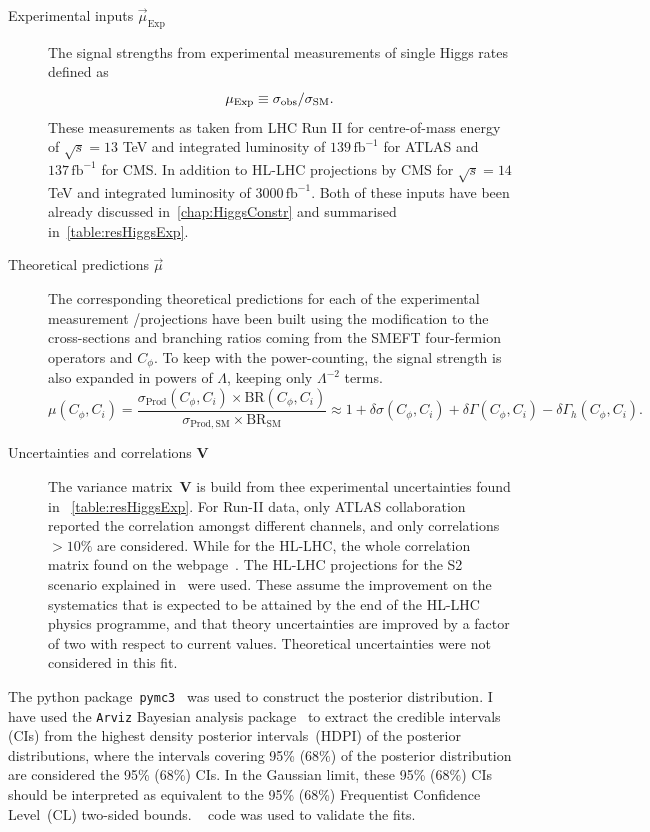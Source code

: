 	\begin{description}
		\item[Experimental inputs $\vec{\mu}_{\mathrm{Exp}}$ ] The signal strengths from experimental measurements of single Higgs rates defined as
		\begin{equation}
			\mu_{\mathrm{Exp}}\equiv \sigma_{\mathrm{obs}}/\sigma_{\mathrm{SM}}.
		\end{equation}
		These measurements as taken from LHC Run II for centre-of-mass energy of $\sqrt{s} = 13$ TeV and  integrated luminosity of $ 139\, \mathrm{fb}^{-1}$ for ATLAS and  $ 137\,\mathrm{fb}^{-1}$ for CMS. In addition to HL-LHC projections by CMS for $\sqrt{s} = 14$ TeV and  integrated luminosity of $ 3000\, \mathrm{fb}^{-1}$. Both of these inputs have been already discussed in~\autoref{chap:HiggsConstr} and summarised in~\autoref{table:resHiggsExp}.
		\item [Theoretical predictions $\vec{\mu}$ ]  The corresponding theoretical predictions for each of the experimental measurement /projections have been built using the modification to the cross-sections and branching ratios coming from the SMEFT four-fermion operators and $C_\phi$. To keep with the power-counting, the signal strength is also expanded in powers of $\Lambda$, keeping only $ \Lambda^{-2}$ terms. 
		\begin{equation}
			\mu(C_\phi,C_i)=\frac{\sigma_\mathrm{ Prod}(C_\phi,C_i) \times \mathrm{ BR}(C_\phi,C_i)}{\sigma_\mathrm{ Prod, SM}\times \mathrm{BR}_\mathrm{ SM}} \approx 1+\delta \sigma(C_\phi,C_i)+\delta\Gamma(C_\phi,C_i)-\delta \Gamma_h(C_\phi,C_i).
			\label{linear-mu}
		\end{equation}
		\item [Uncertainties and correlations $\mathbf{V}$ ]  The variance matrix~$\mathbf{V}$ is build from thee experimental uncertainties found in ~\autoref{table:resHiggsExp}. For Run-II data, only ATLAS collaboration reported the correlation amongst different channels, and only correlations $> 10\%$ are considered. While for the HL-LHC, the whole correlation matrix found on the webpage~\cite{twiki}.  The HL-LHC projections for the S2 scenario explained in~\cite{Cepeda:2019klc} were used. These assume the improvement on the systematics that is expected to be attained by the end of the HL-LHC physics programme, and that theory uncertainties are improved by a factor of two with respect to current values. Theoretical uncertainties were not considered in this fit.
	\end{description}
	The python package~\texttt{pymc3}~\cite{Salvatier2016} was used to construct the posterior distribution. I have used the \texttt{Arviz} Bayesian analysis package~\cite{arviz_2019} to extract the credible intervals (CIs) from the highest density posterior intervals~(HDPI) of the posterior distributions, where the intervals covering 95\% (68\%) of the posterior distribution are considered the 95\% (68\%) CIs. In the Gaussian limit, these  95\% (68\%) CIs should be interpreted as equivalent to the 95\%  (68\%) Frequentist  Confidence Level~(CL) two-sided bounds. \HEPfit~\cite{deBlas:2019okz} code was used to validate the fits.
